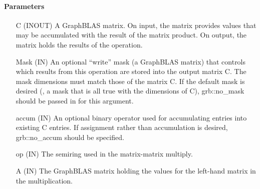 \paragraph{Parameters}

\begin{itemize}[leftmargin=1.1in]
    \item[{\sf C}]    ({\sf INOUT}) A GraphBLAS matrix. On input,
    the matrix provides values that may be accumulated with the result of the
    matrix product.  On output, the matrix holds the results of the
    operation.

    \item[{\sf Mask}] ({\sf IN}) An optional ``write'' mask (a GraphBLAS matrix) that controls which
    results from this operation are stored into the output matrix {\sf C}. The 
    mask dimensions must match those of the matrix {\sf C}. 
    If the default
    mask is desired (\ie, a mask that is all {\sf true} with the dimensions of {\sf C}), 
    {\sf grb::no\_mask} should be passed in for this argument.

    \item[{\sf accum}] ({\sf IN}) An optional binary operator used for accumulating
    entries into existing {\sf C} entries.  If assignment rather than accumulation is
    desired, {\sf grb::no\_accum} should be specified.

    \item[{\sf op}]   ({\sf IN}) The semiring used in the matrix-matrix
    multiply.

    \item[{\sf A}]    ({\sf IN}) The GraphBLAS matrix holding the values
    for the left-hand matrix in the multiplication.


\end{itemize}
